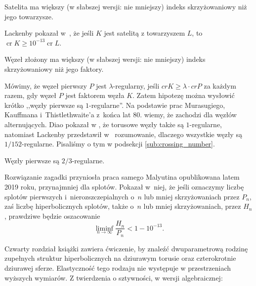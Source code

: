 \begin{conjecture}
    Satelita ma większy (w słabszej wersji: nie mniejszy) indeks skrzyżowaniowy niż jego towarzysze.
\end{conjecture}

Lackenby pokazał w~\cite{lackenby14}, że jeśli $K$ jest satelitą z towarzyszem $L$, to $\operatorname{cr} K \ge 10^{-13} \operatorname{cr} L$.

\begin{conjecture}
    Węzeł złożony ma większy (w słabszej wersji: nie mniejszy) indeks skrzyżowaniowy niż jego faktory.
\end{conjecture}

Mówimy, że węzeł pierwszy $P$ jest $\lambda$-regularny, jeśli $cr K \ge \lambda \cdot cr P$ za każdym razem, gdy węzeł $P$ jest faktorem węzła $K$.
Zatem hipotezę można wysłowić krótko ,,węzły pierwsze są $1$-regularne''.
Na podstawie prac Murasugiego, Kauffmana i~Thistlethwaite'a z~końca lat 80. wiemy, że zachodzi dla węzłów alternujących.
Diao pokazał w \cite[tw. 3.8]{diao04}, że torusowe węzły także są $1$-regularne, natomiast Lackenby przedstawił w~\cite{lackenby09} rozumowanie, dlaczego wszystkie węzły są $1/152$-regularne.
Pisaliśmy o tym w podsekcji \ref{sub:crossing_number}.

\begin{conjecture}
    \label{malyutin4}
    Węzły pierwsze są $2/3$-regularne.
\end{conjecture}

Rozwiązanie zagadki przyniosła praca samego Malyutina \cite{malyutin19} opublikowana latem 2019 roku, przynajmniej dla splotów.
Pokazał w~niej, że jeśli oznaczymy liczbę splotów pierwszych i~nierozszczepialnych o~$n$ lub mniej skrzyżowaniach przez $P_n$, zaś liczbę hiperbolicznych splotów, także o~$n$ lub mniej skrzyżowaniach, przez $H_n$, prawdziwe będzie oszacowanie
\begin{equation}
    \liminf_{n \to \infty} \frac{H_n}{P_n} < 1 - 10^{-13}.
\end{equation}



Czwarty rozdział książki \cite{purcell2020} zawiera ćwiczenie, by znaleźć dwuparametrową rodzinę zupełnych struktur hiperbolicznych na dziurawym torusie oraz czterokrotnie dziurawej sferze.
Elastyczność tego rodzaju nie występuje w przestrzeniach wyższych wymiarów.
Z twierdzenia o sztywności, w wersji algebraicznej:


